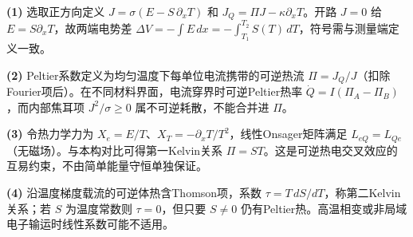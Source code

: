 \par\noindent\textbf{(1)} 选取正方向定义 \(J=\sigma(E-S\,\partial_xT)\) 和 \(J_Q=\Pi J-\kappa\partial_xT\)。开路 \(J=0\) 给 \(E=S\partial_xT\)，故两端电势差 \(\Delta V=-\int E\,dx=-\int_{T_1}^{T_2}S(T)\,dT\)，符号需与测量端定义一致。
\par\noindent\textbf{(2)} Peltier系数定义为均匀温度下每单位电流携带的可逆热流 \(\Pi=J_Q/J\)（扣除Fourier项后）。在不同材料界面，电流穿界时可逆Peltier热率 \( \dot Q=I(\Pi_A-\Pi_B)\) ，而内部焦耳项 \(J^2/\sigma\ge0\) 属不可逆耗散，不能合并进 \(\Pi\)。
\par\noindent\textbf{(3)} 令热力学力为 \(X_e=E/T\)、\(X_T=-\partial_xT/T^2\)，线性Onsager矩阵满足 \(L_{eQ}=L_{Qe}\)（无磁场）。与本构对比可得第一Kelvin关系 \(\Pi=ST\)。这是可逆热电交叉效应的互易约束，不由简单能量守恒单独保证。
\par\noindent\textbf{(4)} 沿温度梯度载流的可逆体热含Thomson项，系数 \(\tau=T\,dS/dT\)，称第二Kelvin关系；若 \(S\) 为温度常数则 \(\tau=0\)，但只要 \(S\neq0\) 仍有Peltier热。高温相变或非局域电子输运时线性系数可能不适用。

